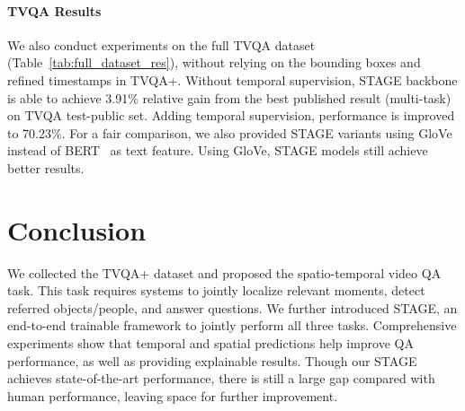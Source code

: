 \documentclass[11pt,a4paper]{article}
\begin{document}
\begin{table}[!t]
\centering
\small
{}
\caption{QA Acc. on the full TVQA dataset.}
\label{tab:full_dataset_res}
\end{table}




\paragraph{TVQA Results} 
We also conduct experiments on the full TVQA dataset (Table~\ref{tab:full_dataset_res}), without relying on the bounding boxes and refined timestamps in TVQA+.
Without temporal supervision, STAGE backbone is able to achieve 3.91\% relative gain from the best published result (multi-task) on TVQA test-public set. 
Adding temporal supervision, performance is improved to 70.23\%. For a fair comparison, we also provided STAGE variants using GloVe~\cite{pennington2014glove} instead of BERT~\cite{Devlin2018BERTPO} as text feature. Using GloVe, STAGE models still achieve better results.



\section{Conclusion}\label{conclusion}

We collected the TVQA+ dataset and proposed the spatio-temporal video QA task. 
This task requires systems to jointly localize relevant moments, detect referred objects/people, and answer questions. 
We further introduced STAGE, an end-to-end trainable framework to jointly perform all three tasks.
Comprehensive experiments show that temporal and spatial predictions help improve QA performance, as well as providing explainable results. 
Though our STAGE achieves state-of-the-art performance, there is still a large gap compared with human performance, leaving space for further improvement.
\end{document}
